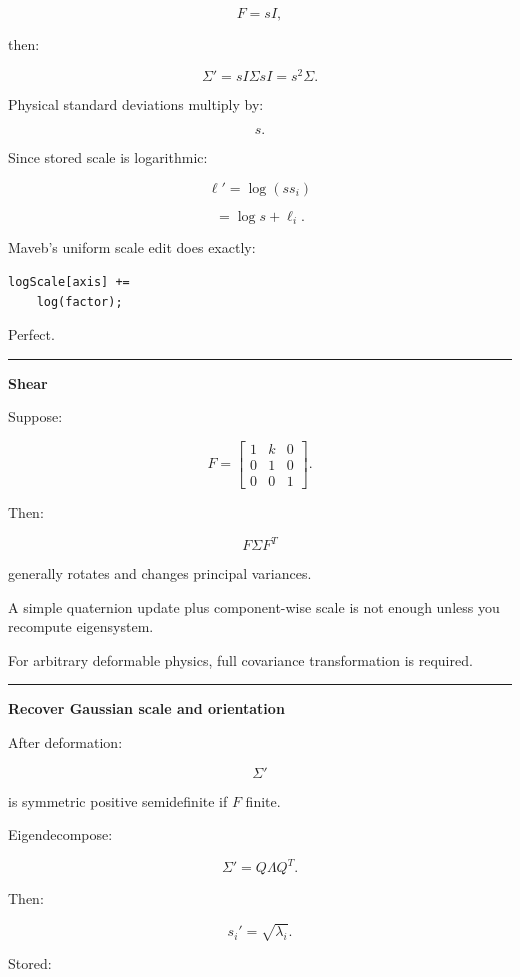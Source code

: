 \[
F=sI,
\]

then:

\[
\Sigma'
=
sI\Sigma sI
=
\boxed{s^2\Sigma}.
\]

Physical standard deviations multiply by:

\[
s.
\]

Since stored scale is logarithmic:

\[
\ell'=
\log(ss_i)
\]

\[
=
\log s+\ell_i.
\]

Maveb's uniform scale edit does exactly:

\begin{verbatim}
logScale[axis] +=
    log(factor);
\end{verbatim}

Perfect.

\begin{center}\rule{0.5\linewidth}{0.5pt}\end{center}

\textbf{Shear}

Suppose:

\[
F=
\begin{bmatrix}
1&k&0\\
0&1&0\\
0&0&1
\end{bmatrix}.
\]

Then:

\[
F\Sigma F^T
\]

generally rotates and changes principal variances.

A simple quaternion update plus component-wise scale is not enough unless you recompute eigensystem.

For arbitrary deformable physics, full covariance transformation is required.

\begin{center}\rule{0.5\linewidth}{0.5pt}\end{center}

\textbf{Recover Gaussian scale and orientation}

After deformation:

\[
\Sigma'
\]

is symmetric positive semidefinite if \(F\) finite.

Eigendecompose:

\[
\Sigma'
=
Q\Lambda Q^T.
\]

Then:

\[
s_i'=
\sqrt{\lambda_i}.
\]

Stored:

